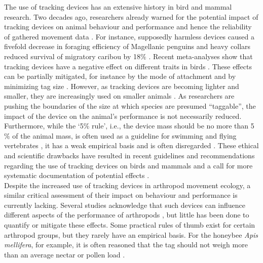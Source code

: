 \documentclass[10pt, twoside]{book} %
\begin{document}
	The use of tracking devices has an extensive history in bird and mammal research. Two decades ago, researchers already warned for the potential impact of tracking devices on animal behaviour and performance and hence the reliability of gathered movement data \citep{mech2002, godfrey2003}. For instance, supposedly harmless devices caused a fivefold decrease in foraging efficiency of Magellanic penguins \citep{wilson2004} and heavy collars reduced survival of migratory caribou by 18$\%$ \citep{rasiulis2014}. Recent meta-analyses show that tracking devices have a negative effect on different traits in birds \citep{barron2010, bodey2018, brlik2020}. These effects can be partially mitigated, for instance by the mode of attachment \citep{white2012} and by minimizing tag size \citep{casper2009, bodey2018}. However, as tracking devices are becoming lighter and smaller, they are increasingly used on smaller animals \citep{portugal2018}. As researchers are pushing the boundaries of the size at which species are presumed ``taggable'', the impact of the device on the animal's performance is not necessarily reduced. Furthermore, while the `5$\%$ rule', i.e., the device mass should be no more than 5$\%$ of the animal mass, is often used as a guideline for swimming and flying vertebrates \citep{aldridge1988, kenward2000}, it has a weak empirical basis and is often disregarded \citep{barron2010, omara2014, portugal2018}. These ethical and scientific drawbacks have resulted in recent guidelines and recommendations regarding the use of tracking devices on birds and mammals \citep{wilson2006, casper2009, omara2014, kays2015, mcintyre2015} and a call for more systematic documentation of potential effects \citep{geen2019}.\\
	
	Despite the increased use of tracking devices in arthropod movement ecology, a similar critical assessment of their impact on behaviour and performance is currently lacking. Several studies acknowledge that such devices can influence different aspects of the performance of arthropods \citep{gui2011, lenaour2019}, but little has been done to quantify or mitigate these effects. Some practical rules of thumb exist for certain arthropod groups, but they rarely have an empirical basis. For the honeybee \textit{Apis mellifera}, for example, it is often reasoned that the tag should not weigh more than an average nectar or pollen load \citep{capaldi2000}.\\
	
\end{document}
